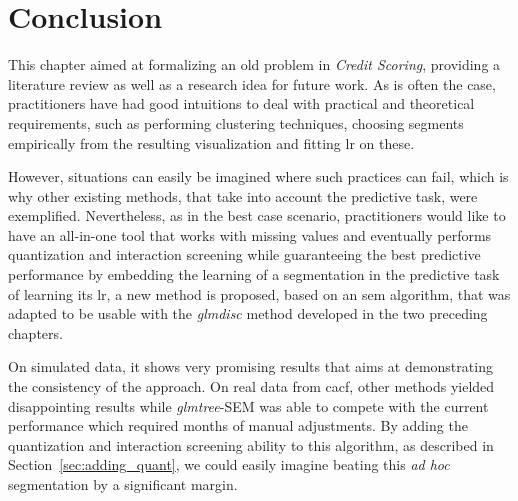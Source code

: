 \section{Conclusion}

This chapter aimed at formalizing an old problem in \textit{Credit Scoring}, providing a literature review as well as a research idea for future work. As is often the case, practitioners have had good intuitions to deal with practical and theoretical requirements, such as performing clustering techniques, choosing segments empirically from the resulting visualization and fitting \gls{lr} on these.

However, situations can easily be imagined where such practices can fail, which is why other existing methods, that take into account the predictive task, were exemplified. Nevertheless, as in the best case scenario, practitioners would like to have an all-in-one tool that works with missing values and eventually performs quantization and interaction screening while guaranteeing the best predictive performance by embedding the learning of a segmentation in the predictive task of learning its \gls{lr}, a new method is proposed, based on an \gls{sem} algorithm, that was adapted to be usable with the \textit{glmdisc} method developed in the two preceding chapters.

On simulated data, it shows very promising results that aims at demonstrating the consistency of the approach. On real data from \gls{cacf}, other methods yielded disappointing results while \textit{glmtree}-SEM was able to compete with the current performance which required months of manual adjustments. By adding the quantization and interaction screening ability to this algorithm, as described in Section~\ref{sec:adding_quant}, we could easily imagine beating this \textit{ad hoc} segmentation by a significant margin.

\printbibliography[heading=subbibliography, title=References of Chapter 5]

